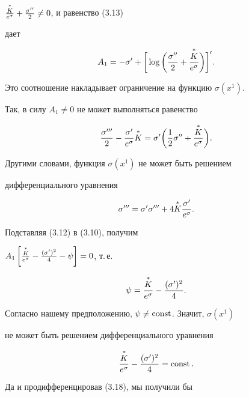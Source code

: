 $\frac{\overset{*}{K}{}}{e^\sigma}+\frac{\sigma''}{2}\ne 0$, и равенство (3.13) 


дает 


\begin{equation} 


A_1=-\sigma'+\bigg[\log\bigg(\frac{\sigma''}{2}+ 


\frac{\up{K}}{e^\sigma}\bigg)\bigg]'. 


\end{equation} 


Это соотношение накладывает ограничение на функцию $\sigma(x^1)$. 


Так, в силу $A_1\ne 0$ не может выполняться равенство 


$$ 


\frac{\sigma'''}{2}-\frac{\sigma'}{e^\sigma}\up{K}= 


\sigma'\bigg(\frac{1}{2}\sigma''+\frac{\up{K}}{e^\sigma}\bigg). 


$$ 


Другими словами, функция $\sigma(x^1)$ не может быть решением 


дифференциального уравнения 


\begin{equation}  


\sigma'''=\sigma'\sigma'''+4\up{K}\frac{\sigma'}{e^\sigma}. 


\end{equation}  


Подставляя (3.12) в (3.10), получим 


$A_1\left[\frac{\up{K}}{e^\sigma}-\frac{(\sigma')^2}{4}- 


\psi\right]=0$, т.\,е. 


\begin{equation} 


\psi=\frac{\up{K}}{e^\sigma}-\frac{(\sigma')^2}{4}. 


\end{equation} 


Согласно нашему предположению, $\psi\ne\operatorname{const}$. Значит, $\sigma(x^1)$ 


не может быть решением дифференциального уравнения 


\begin{equation} 


\frac{\up{K}}{e^\sigma}-\frac{(\sigma')^2}{4}=\const. 


\end{equation} 


Да и продифференцировав (3.18), мы получили бы 


